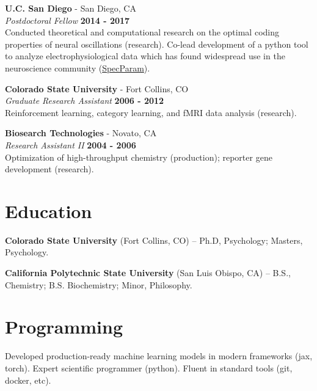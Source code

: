 \documentclass[margin,line]{res}
\begin{document}
\begin{resume}
\vspace{-.1cm}
{\bf U.C. San Diego} - San Diego, CA\\
{\em Postdoctoral Fellow} \hfill {\bf 2014 - 2017}\\
Conducted theoretical and computational research on the optimal coding properties of neural oscillations (research). Co-lead development of a python tool to analyze electrophysiological data which has found widespread use in the neuroscience community (\href{https://github.com/fooof-tools/fooof}{SpecParam}).

\vspace{-.1cm}
{\bf Colorado State University} - Fort Collins, CO\\
{\em Graduate Research Assistant} \hfill {\bf 2006 - 2012}\\
Reinforcement learning, category learning, and fMRI data analysis (research). 

\vspace{-.1cm}
{\bf Biosearch Technologies} - Novato, CA\\
{\em Research Assistant II} \hfill {\bf 2004 - 2006}\\
Optimization of high-throughput chemistry (production); reporter gene development (research).

\vspace{-.2cm}
\section{\sc Education}
{\bf Colorado State University} (Fort Collins, CO) --  Ph.D, Psychology; Masters, Psychology.\\
\vspace*{-.15in}

\vspace*{-.15in}
{\bf California Polytechnic State University} (San Luis Obispo, CA) -- B.S., Chemistry; B.S. Biochemistry; Minor, Philosophy.\\

\vspace{-.5cm}
\section{\sc Programming} Developed production-ready machine learning models in modern frameworks (jax, torch). Expert scientific programmer (python). Fluent in standard tools (git, docker, etc).


\end{resume}
\end{document}

